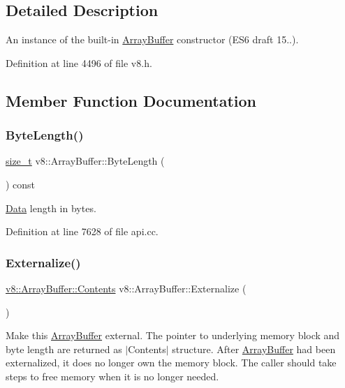 \subsection{Detailed Description}
An instance of the built-\/in \mbox{\hyperlink{classv8_1_1ArrayBuffer}{Array\+Buffer}} constructor (E\+S6 draft 15..). 

Definition at line 4496 of file v8.\+h.



\subsection{Member Function Documentation}
\mbox{\label{classv8_1_1ArrayBuffer_af4c4ad8075f74892ed3fa217219a2626}} 
\subsubsection{\texorpdfstring{Byte\+Length()}{ByteLength()}}
{\footnotesize\ttfamily \mbox{\hyperlink{classsize__t}{size\+\_\+t}} v8\+::\+Array\+Buffer\+::\+Byte\+Length (\begin{DoxyParamCaption}{ }\end{DoxyParamCaption}) const}

\mbox{\hyperlink{classv8_1_1Data}{Data}} length in bytes. 

Definition at line 7628 of file api.\+cc.

\mbox{\label{classv8_1_1ArrayBuffer_a166848a34653afd4502e4cc33443815d}} 
\subsubsection{\texorpdfstring{Externalize()}{Externalize()}}
{\footnotesize\ttfamily \mbox{\hyperlink{classv8_1_1ArrayBuffer_1_1Contents}{v8\+::\+Array\+Buffer\+::\+Contents}} v8\+::\+Array\+Buffer\+::\+Externalize (\begin{DoxyParamCaption}{ }\end{DoxyParamCaption})}

Make this \mbox{\hyperlink{classv8_1_1ArrayBuffer}{Array\+Buffer}} external. The pointer to underlying memory block and byte length are returned as $\vert$\+Contents$\vert$ structure. After \mbox{\hyperlink{classv8_1_1ArrayBuffer}{Array\+Buffer}} had been externalized, it does no longer own the memory block. The caller should take steps to free memory when it is no longer needed.


